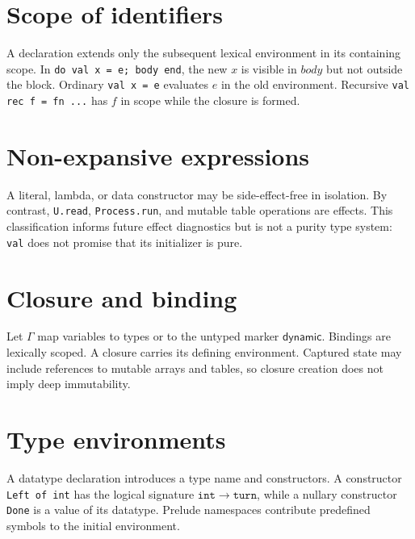 \documentclass[11pt,oneside,openany]{book}
\newcommand{\kw}[1]{\texttt{#1}}
\begin{document}
\section{Scope of identifiers}
A declaration extends only the subsequent lexical environment in its containing scope. In \kw{do val x = e; body end}, the new $x$ is visible in $body$ but not outside the block. Ordinary \kw{val x = e} evaluates $e$ in the old environment. Recursive \kw{val rec f = fn ...} has $f$ in scope while the closure is formed.

\section{Non-expansive expressions}
A literal, lambda, or data constructor may be side-effect-free in isolation. By contrast, \kw{U.read}, \kw{Process.run}, and mutable table operations are effects. This classification informs future effect diagnostics but is not a purity type system: \kw{val} does not promise that its initializer is pure.

\section{Closure and binding}
Let $\Gamma$ map variables to types or to the untyped marker $\mathsf{dynamic}$. Bindings are lexically scoped. A closure carries its defining environment. Captured state may include references to mutable arrays and tables, so closure creation does not imply deep immutability.

\section{Type environments}
A datatype declaration introduces a type name and constructors. A constructor \kw{Left of int} has the logical signature $\mathtt{int}\to\mathtt{turn}$, while a nullary constructor \kw{Done} is a value of its datatype. Prelude namespaces contribute predefined symbols to the initial environment.
\end{document}
